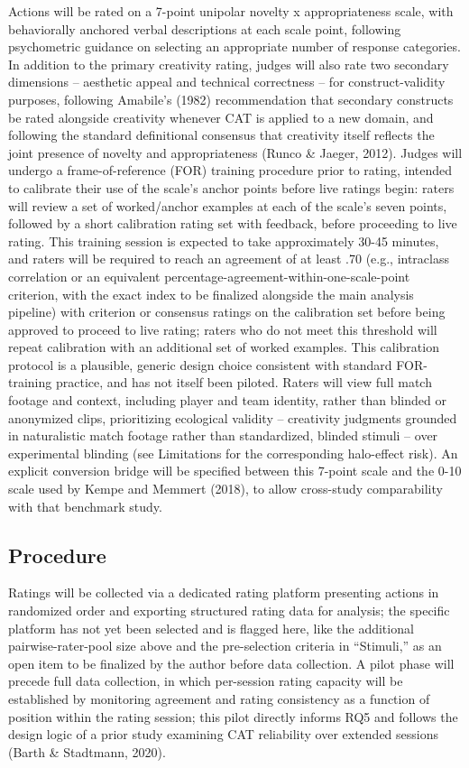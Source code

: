 \documentclass[
  12pt,
]{article}
\begin{document}
Actions will be rated on a 7-point unipolar novelty x appropriateness
scale, with behaviorally anchored verbal descriptions at each scale
point, following psychometric guidance on selecting an appropriate
number of response categories. In addition to the primary creativity
rating, judges will also rate two secondary dimensions -- aesthetic
appeal and technical correctness -- for construct-validity purposes,
following Amabile's (1982) recommendation that secondary constructs be
rated alongside creativity whenever CAT is applied to a new domain, and
following the standard definitional consensus that creativity itself
reflects the joint presence of novelty and appropriateness (Runco \&
Jaeger, 2012). Judges will undergo a frame-of-reference (FOR) training
procedure prior to rating, intended to calibrate their use of the
scale's anchor points before live ratings begin: raters will review a
set of worked/anchor examples at each of the scale's seven points,
followed by a short calibration rating set with feedback, before
proceeding to live rating. This training session is expected to take
approximately 30-45 minutes, and raters will be required to reach an
agreement of at least .70 (e.g., intraclass correlation or an equivalent
percentage-agreement-within-one-scale-point criterion, with the exact
index to be finalized alongside the main analysis pipeline) with
criterion or consensus ratings on the calibration set before being
approved to proceed to live rating; raters who do not meet this
threshold will repeat calibration with an additional set of worked
examples. This calibration protocol is a plausible, generic design
choice consistent with standard FOR-training practice, and has not
itself been piloted. Raters will view full match footage and context,
including player and team identity, rather than blinded or anonymized
clips, prioritizing ecological validity -- creativity judgments grounded
in naturalistic match footage rather than standardized, blinded stimuli
-- over experimental blinding (see Limitations for the corresponding
halo-effect risk). An explicit conversion bridge will be specified
between this 7-point scale and the 0-10 scale used by Kempe and Memmert
(2018), to allow cross-study comparability with that benchmark study.

\subsection{Procedure}\label{procedure}

Ratings will be collected via a dedicated rating platform presenting
actions in randomized order and exporting structured rating data for
analysis; the specific platform has not yet been selected and is flagged
here, like the additional pairwise-rater-pool size above and the
pre-selection criteria in ``Stimuli,'' as an open item to be finalized
by the author before data collection. A pilot phase will precede full
data collection, in which per-session rating capacity will be
established by monitoring agreement and rating consistency as a function
of position within the rating session; this pilot directly informs RQ5
and follows the design logic of a prior study examining CAT reliability
over extended sessions (Barth \& Stadtmann, 2020).
\end{document}
